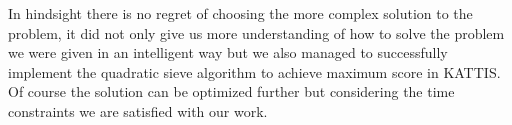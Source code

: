 In hindsight there is no regret of choosing the more complex solution to the problem, it did not only give us more understanding of how to solve the problem we were given in an intelligent way but we also managed to successfully implement the quadratic sieve algorithm to achieve maximum score in KATTIS. Of course the solution can be optimized further but considering the time constraints we are satisfied with our work.